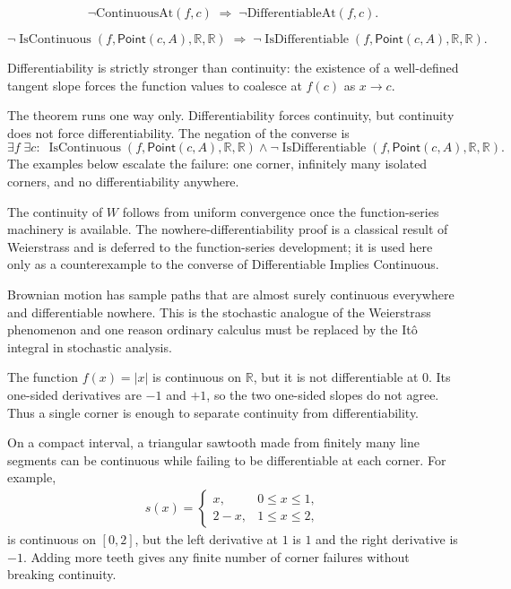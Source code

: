 \begin{remark*}[Interpretation]
\[
\neg \text{ContinuousAt}(f,c) \;\Rightarrow\; \neg \text{DifferentiableAt}(f,c).
\]


\[
\neg\operatorname{IsContinuous}(f,\mathsf{Point}(c,A),\mathbb R,\mathbb R)
\;\Longrightarrow\;
\neg\operatorname{IsDifferentiable}(f,\mathsf{Point}(c,A),\mathbb R,\mathbb R).
\]


Differentiability is strictly stronger than continuity: the existence of a well-defined tangent slope forces the function values to coalesce at $f(c)$ as $x \to c$.


The theorem runs one way only. Differentiability forces continuity, but
continuity does not force differentiability. The negation of the converse is
\[
  \exists f\;\exists c:\;
  \operatorname{IsContinuous}(f,\mathsf{Point}(c,A),\mathbb R,\mathbb R)\land
  \neg\operatorname{IsDifferentiable}(f,\mathsf{Point}(c,A),\mathbb R,\mathbb R).
\]
The examples below escalate the failure: one corner, infinitely many isolated
corners, and no differentiability anywhere.


The continuity of \(W\) follows from uniform convergence once the
function-series machinery is available. The nowhere-differentiability proof
is a classical result of Weierstrass and is deferred to the function-series
development; it is used here only as a counterexample to the converse of
Differentiable Implies Continuous.


Brownian motion has sample paths that are almost surely continuous
everywhere and differentiable nowhere. This is the stochastic analogue of the
Weierstrass phenomenon and one reason ordinary calculus must be replaced by
the It\^o integral in stochastic analysis.
\end{remark*}

\begin{exposition}
\label{ex:cont-not-diff-corner}
The function \(f(x)=|x|\) is continuous on \(\mathbb{R}\), but it is not
differentiable at \(0\). Its one-sided derivatives are \(-1\) and \(+1\), so
the two one-sided slopes do not agree. Thus a single corner is enough to
separate continuity from differentiability.
\end{exposition}

\begin{exposition}
\label{ex:cont-not-diff-sawtooth}
On a compact interval, a triangular sawtooth made from finitely many line
segments can be continuous while failing to be differentiable at each corner.
For example,
\[
\begin{aligned}
  s(x)=
  \begin{cases}
    x, & 0\leq x\leq 1,\\
    2-x, & 1\leq x\leq 2,
  \end{cases}
\end{aligned}
\]
is continuous on \([0,2]\), but the left derivative at \(1\) is \(1\) and the
right derivative is \(-1\). Adding more teeth gives any finite number of
corner failures without breaking continuity.
\end{exposition}

